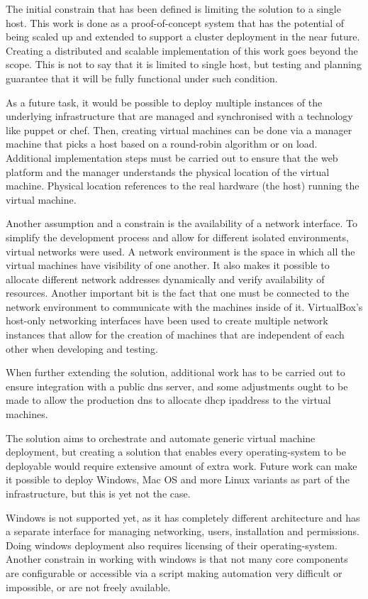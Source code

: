 \documentclass{article}
\begin{document}
The initial constrain that has been defined is limiting the solution to a single host. This work is done as a proof-of-concept system that has the potential of being scaled up and extended to support a cluster deployment in the near future.
Creating a distributed and scalable implementation of this work goes beyond the scope. This is not to say that it is limited to single host, but testing and planning guarantee that it will be fully functional under such condition.

As a future task, it would be possible to deploy multiple instances of the underlying infrastructure that are managed and synchronised with a technology like puppet or chef. Then, creating virtual machines can be done via a manager machine that picks a host based on a round-robin algorithm or on load. Additional implementation steps must be carried out to ensure that the web platform and the manager understands the physical location of the virtual machine. Physical location references to the real hardware (the host) running the virtual machine.

Another assumption and a constrain is the availability of a network interface. To simplify the development process and allow for  different isolated environments, virtual networks were used. A network environment is the space in which all the virtual machines have visibility of one another. It also makes it possible to allocate different network addresses dynamically and verify availability of resources. Another important bit is the fact that one must be connected to the network environment to communicate with the machines inside of it. VirtualBox's host-only networking interfaces have been used to create multiple network instances that allow for the creation of machines that are independent of each other when developing and testing.

When further extending the solution, additional work has to be carried out to ensure integration with a public \gls{dns} server, and some adjustments ought to be made to allow the production \gls{dns} to allocate \gls{dhcp} \gls{ipaddress} to the virtual machines.

The solution aims to orchestrate and automate generic virtual machine deployment, but creating a solution that enables every \gls{operating-system} to be deployable would require extensive amount of extra work. Future work can make it possible to deploy Windows, Mac OS and more Linux variants as part of the infrastructure, but this is yet not the case.

Windows is not supported yet, as it has completely different architecture and has a separate interface for managing networking, users, installation and permissions. Doing windows deployment also requires licensing of their \gls{operating-system}. Another constrain in working with windows is that not many core components are configurable or accessible via a script making automation very difficult or impossible, or are not freely available.
\end{document}
